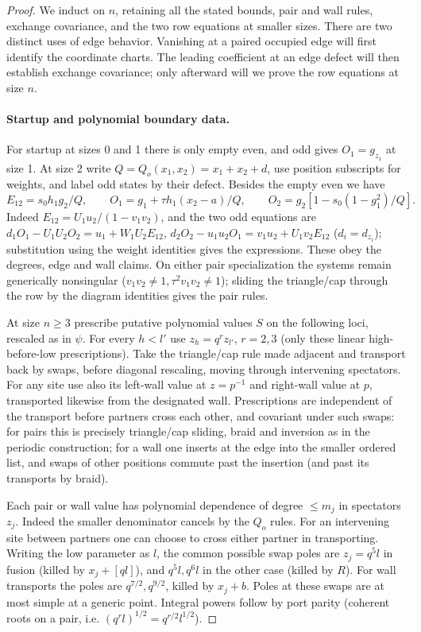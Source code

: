\documentclass[11pt]{article}
\numberwithin{equation}{section}
\theoremstyle{definition}\newtheorem{definition}[theorem]{Definition}
\theoremstyle{remark}\newtheorem{remark}[theorem]{Remark}
\begin{document}
\begin{proof}
We induct on $n$, retaining all the stated bounds, pair and wall rules,
exchange covariance, and the two row equations at smaller sizes.
There are two distinct uses of edge behavior. Vanishing at a paired
occupied edge will first identify the coordinate charts. The leading
coefficient at an edge defect will then establish exchange covariance;
only afterward will we prove the row equations at size $n$.

\paragraph{Startup and polynomial boundary data.} For startup at sizes 0 and 1 there is only empty even, and odd gives \(O_1=g_{z_1}\) at size 1. At size 2 write \(Q=Q_o(x_1,x_2)=x_1+x_2+d\), use position subscripts for weights, and label odd states by their defect. Besides the empty even we have
\[
 E_{12}=s_0 h_1 g_2/Q,\qquad
 O_1=g_1+\tau h_1(x_2-a)/Q,\qquad O_2=g_2[1-s_0(1-g_1^2)/Q].
\]
Indeed \(E_{12}=U_1u_2/(1-v_1v_2)\), and the two odd equations are
\(d_1 O_1-U_1U_2 O_2=u_1+W_1U_2 E_{12}\),
\(d_2 O_2-u_1u_2 O_1=v_1u_2+U_1 v_2 E_{12}\) (\(d_i=d_{z_i}\)); substitution using the weight identities gives the expressions. These obey the degrees, edge and wall claims. On either pair specialization the systems remain generically nonsingular (\(v_1v_2\ne1,\tau^2 v_1v_2\ne1\)); sliding the triangle/cap through the row by the diagram identities gives the pair rules.

At size \(n\ge3\) prescribe putative polynomial values \(S\) on the following loci, rescaled as in \(\psi\). For every \(h<l'\) use \(z_h=q^r z_{l'}\), \(r=2,3\) (only these linear high-before-low prescriptions). Take the triangle/cap rule made adjacent and transport back by swaps, before diagonal rescaling, moving through intervening spectators. For any site use also its left-wall value at \(z=p^{-1}\) and right-wall value at \(p\), transported likewise from the designated wall. Prescriptions are independent of the transport before partners cross each other, and covariant under such swaps: for pairs this is precisely triangle/cap sliding, braid and inversion as in the periodic construction; for a wall one inserts at the edge into the smaller ordered list, and swaps of other positions commute past the insertion (and past its transports by braid).

Each pair or wall value has polynomial dependence of degree \(\le m_j\) in spectators \(z_j\). Indeed the smaller denominator cancels by the \(Q_o\) rules. For an intervening site between partners one can choose to cross either partner in transporting. Writing the low parameter as \(l\), the common possible swap poles are \(z_j=q^5 l\) in fusion (killed by \(x_j+[q l]\)), and \(q^5 l,q^6 l\) in the other case (killed by \(R\)). For wall transports the poles are \(q^{7/2},q^{9/2}\), killed by \(x_j+b\). Poles at these swaps are at most simple at a generic point. Integral powers follow by port parity (coherent roots on a pair, i.e. \((q^r l)^{1/2}=q^{r/2}l^{1/2}\)). 


\end{proof}
\end{document}
